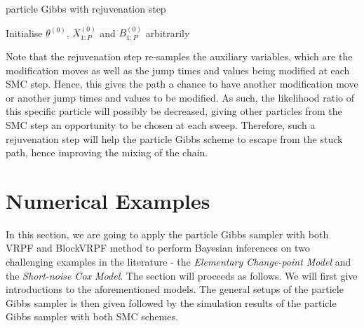 \documentclass[12pt,a4paper]{article}
\begin{document}
\begin{algorithm}[htb!]
    \caption{particle Gibbs with rejuvenation step}
            Initialise $\theta^{(0)}$, $X_{1:P}^{(0)}$ and $B_{1:P}^{(0)}$ arbitrarily\;
    \label{particle Gibbs-rejuvenation}
\end{algorithm}

Note that the rejuvenation step re-samples the auxiliary variables, which are the modification moves as well as the jump times and values being modified at each SMC step. Hence, this gives the path a chance to have another modification move or another jump times and values to be modified. As such, the likelihood ratio of this specific particle will possibly be decreased, giving other particles from the SMC step an opportunity to be chosen at each sweep. Therefore, such a rejuvenation step will help the particle Gibbs scheme to escape from the stuck path, hence improving the mixing of the chain. 

\section{Numerical Examples}
In this section, we are going to apply the particle Gibbs sampler with both VRPF and BlockVRPF method to perform Bayesian inferences on two challenging examples in the literature - the \textit{Elementary Change-point Model} and the \textit{Short-noise Cox Model}. The section will proceeds as follows. We will first give introductions to the aforementioned models. The general setups of the particle Gibbs sampler is then given followed by the simulation results of the particle Gibbs sampler with both SMC schemes. 
\end{document}
